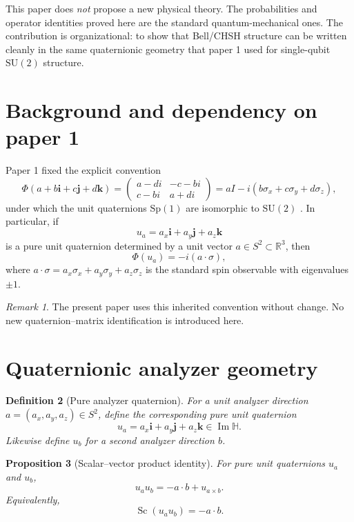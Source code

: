 \documentclass[11pt]{article}
\newtheorem{definition}{Definition}[section]
\newtheorem{proposition}[definition]{Proposition}
\theoremstyle{remark}
\newtheorem{remark}[definition]{Remark}
\newcommand{\R}{\mathbb{R}}
\newcommand{\HH}{\mathbb{H}}
\newcommand{\SU}{\mathrm{SU}}
\newcommand{\Sp}{\mathrm{Sp}}
\newcommand{\ii}{\mathbf{i}}
\newcommand{\jj}{\mathbf{j}}
\newcommand{\kk}{\mathbf{k}}
\newcommand{\Id}{I}
\newcommand{\Sc}{\operatorname{Sc}}
\begin{document}
This paper does \emph{not} propose a new physical theory. The probabilities and operator identities proved here are the standard quantum-mechanical ones. The contribution is organizational: to show that Bell/CHSH structure can be written cleanly in the same quaternionic geometry that paper 1 used for single-qubit $\SU(2)$ structure.

\section{Background and dependency on paper 1}

Paper 1 fixed the explicit convention
\begin{equation}
\Phi(a+b\ii+c\jj+d\kk)
=
\begin{pmatrix}
a-di & -c-bi \\
c-bi & a+di
\end{pmatrix}
=
a\Id-i(b\sigma_x+c\sigma_y+d\sigma_z),
\label{eq:phi}
\end{equation}
under which the unit quaternions $\Sp(1)$ are isomorphic to $\SU(2)$ \citep{hall2015,kuipers1999,penrose1984}. In particular, if
\[
u_a = a_x \ii + a_y \jj + a_z \kk
\]
is a pure unit quaternion determined by a unit vector $a\in S^2\subset\R^3$, then
\begin{equation}
\Phi(u_a) = -i(a\cdot \sigma),
\label{eq:pure-map}
\end{equation}
where $a\cdot \sigma = a_x \sigma_x + a_y \sigma_y + a_z \sigma_z$ is the standard spin observable with eigenvalues $\pm 1$.

\begin{remark}
The present paper uses this inherited convention without change. No new quaternion--matrix identification is introduced here.
\end{remark}

\section{Quaternionic analyzer geometry}

\begin{definition}[Pure analyzer quaternion]
For a unit analyzer direction $a=(a_x,a_y,a_z)\in S^2$, define the corresponding pure unit quaternion
\[
u_a = a_x \ii + a_y \jj + a_z \kk \in \operatorname{Im}\HH.
\]
Likewise define $u_b$ for a second analyzer direction $b$.
\end{definition}

\begin{proposition}[Scalar--vector product identity]
For pure unit quaternions $u_a$ and $u_b$,
\begin{equation}
u_a u_b = -a\cdot b + u_{a\times b}.
\label{eq:scalar-vector}
\end{equation}
Equivalently,
\[
\Sc(u_a u_b) = -a\cdot b.
\]
\end{proposition}
\end{document}
